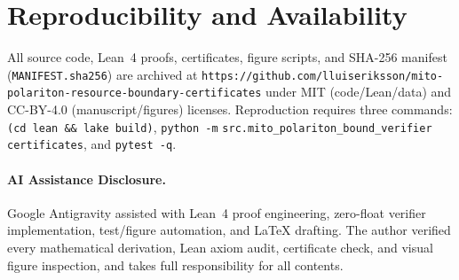 \documentclass[10pt,twocolumn]{article}
\begin{document}
\section{Reproducibility and Availability}
All source code, Lean~4 proofs, certificates, figure scripts, and SHA-256 manifest (\texttt{MANIFEST.sha256}) are archived at \nolinkurl{https://github.com/lluiseriksson/mito-polariton-resource-boundary-certificates} under MIT (code/Lean/data) and CC-BY-4.0 (manuscript/figures) licenses. Reproduction requires three commands: \texttt{(cd lean \&\& lake build)}, \texttt{python -m} \nolinkurl{src.mito_polariton_bound_verifier} \texttt{certificates}, and \texttt{pytest -q}.

\paragraph{AI Assistance Disclosure.}
Google Antigravity assisted with Lean~4 proof engineering, zero-float verifier implementation, test/figure automation, and LaTeX drafting. The author verified every mathematical derivation, Lean axiom audit, certificate check, and visual figure inspection, and takes full responsibility for all contents.



\end{document}
